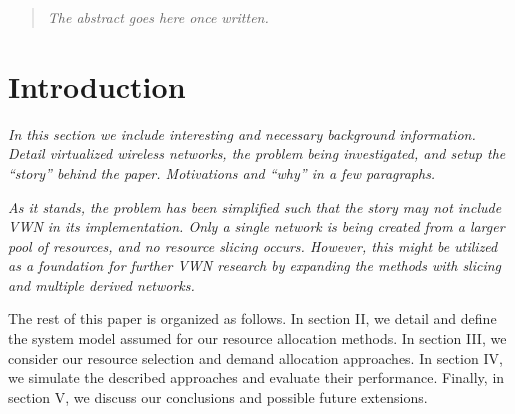 \documentclass[onecolumn,draftcls]{IEEEtran}
\begin{document}




\maketitle

\begin{abstract}
\textit{The abstract goes here once written.}
\end{abstract}





%
\IEEEpeerreviewmaketitle



\section{Introduction}\textit{In this section we include interesting and necessary background information.  Detail virtualized wireless networks, the problem being investigated, and setup the ``story'' behind the paper.  Motivations and ``why'' in a few paragraphs.}

\textit{As it stands, the problem has been simplified such that the story may not include VWN in its implementation.  Only a single network is being created from a larger pool of resources, and no resource slicing occurs.  However, this might be utilized as a foundation for further VWN research by expanding the methods with slicing and multiple derived networks.}

The rest of this paper is organized as follows.  In section II, we detail and define the system model assumed for our resource allocation methods.  In section III, we consider our resource selection and demand allocation approaches.  In section IV, we simulate the described approaches and evaluate their performance.  Finally, in section V, we discuss our conclusions and possible future extensions.
\end{document}
